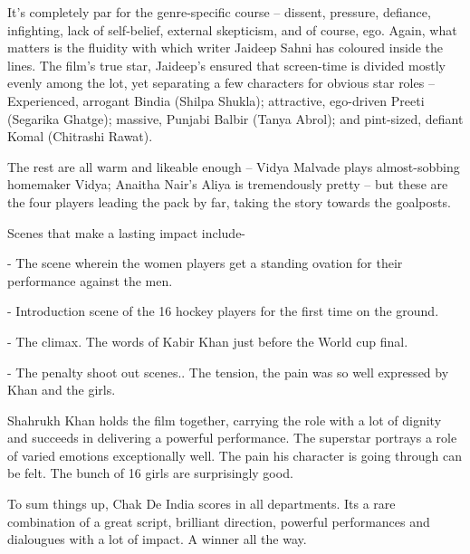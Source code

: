 \documentclass[11pt]{article} %
\begin{document}
It's completely par for the genre-specific course -- dissent, pressure, defiance, infighting, lack of self-belief, external skepticism, and of course, ego. Again, what matters is the fluidity with which writer Jaideep Sahni has coloured inside the lines. The film's true star, Jaideep's ensured that screen-time is divided mostly evenly among the lot, yet separating a few characters for obvious star roles -- Experienced, arrogant Bindia (Shilpa Shukla); attractive, ego-driven Preeti (Segarika Ghatge); massive, Punjabi Balbir (Tanya Abrol); and pint-sized, defiant Komal (Chitrashi Rawat).

The rest are all warm and likeable enough -- Vidya Malvade plays almost-sobbing homemaker Vidya; Anaitha Nair's Aliya is tremendously pretty -- but these are the four players leading the pack by far, taking the story towards the goalposts.

Scenes that make a lasting impact include-

- The scene wherein the women players get a standing ovation for their performance against the men.

- Introduction scene of the 16 hockey players for the first time on the ground.

- The climax. The words of Kabir Khan just before the World cup final.

- The penalty shoot out scenes.. The tension, the pain was so well expressed by Khan and the girls.

Shahrukh Khan holds the film together, carrying the role with a lot of dignity and succeeds in delivering a powerful performance. The superstar portrays a role of varied emotions exceptionally well. The pain his character is going through can be felt. The bunch of 16 girls are surprisingly good.

To sum things up, Chak De India scores in all departments. Its a rare combination of a great script, brilliant direction, powerful performances and dialougues with a lot of impact. A winner all the way.
\end{document}
